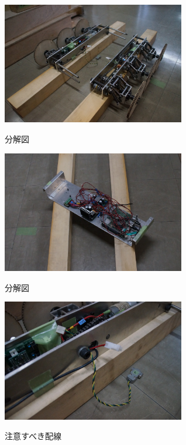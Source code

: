 \begin{figure}[htp]
 \begin{center}
  \includegraphics[width=80mm]{img/hard/f9.jpg}
 　\caption{分解図}
  \label{fig:robot}%
 \end{center}
\end{figure}


\begin{figure}[htp]
 \begin{center}
  \includegraphics[width=80mm]{img/hard/f8.jpg}
 　\caption{分解図}
  \label{fig:robot}%
 \end{center}
\end{figure}


\begin{figure}[htp]
 \begin{center}
  \includegraphics[width=80mm]{img/hard/f7.jpg}
 　\caption{注意すべき配線}
  \label{fig:robot}%
 \end{center}
\end{figure}




